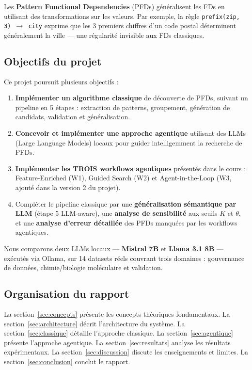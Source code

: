 \documentclass[12pt,a4paper]{article}
\begin{document}
Les \textbf{Pattern Functional Dependencies} (PFDs) g\'{e}n\'{e}ralisent les FDs en utilisant des transformations sur les valeurs. Par exemple, la r\`{e}gle \texttt{prefix(zip, 3) $\rightarrow$ city} exprime que les 3 premiers chiffres d'un code postal d\'{e}terminent g\'{e}n\'{e}ralement la ville --- une r\'{e}gularit\'{e} invisible aux FDs classiques.

\subsection{Objectifs du projet}

Ce projet poursuit plusieurs objectifs :

\begin{enumerate}[label=\arabic*.]
    \item \textbf{Impl\'{e}menter un algorithme classique} de d\'{e}couverte de PFDs, suivant un pipeline en 5 \'{e}tapes : extraction de patterns, groupement, g\'{e}n\'{e}ration de candidats, validation et g\'{e}n\'{e}ralisation.
    \item \textbf{Concevoir et impl\'{e}menter une approche agentique} utilisant des LLMs (Large Language Models) locaux pour guider intelligemment la recherche de PFDs.
    \item \textbf{Impl\'{e}menter les TROIS workflows agentiques} pr\'{e}sent\'{e}s dans le cours : Feature-Enriched (W1), Guided Search (W2) et Agent-in-the-Loop (W3, ajout\'{e} dans la version 2 du projet).
    \item Compl\'{e}ter le pipeline classique par une \textbf{g\'{e}n\'{e}ralisation s\'{e}mantique par LLM} (\'{e}tape 5 LLM-aware), une \textbf{analyse de sensibilit\'{e}} aux seuils $K$ et $\theta$, et une \textbf{analyse d'erreur d\'{e}taill\'{e}e} des PFDs manqu\'{e}es par les workflows agentiques.
\end{enumerate}

Nous comparons deux LLMs locaux --- \textbf{Mistral 7B} et \textbf{Llama 3.1 8B} --- ex\'{e}cut\'{e}s via Ollama, sur 14 datasets r\'{e}els couvrant trois domaines : gouvernance de donn\'{e}es, chimie/biologie mol\'{e}culaire et validation.

\subsection{Organisation du rapport}

La section~\ref{sec:concepts} pr\'{e}sente les concepts th\'{e}oriques fondamentaux. La section~\ref{sec:architecture} d\'{e}crit l'architecture du syst\`{e}me. La section~\ref{sec:classique} d\'{e}taille l'approche classique. La section~\ref{sec:agentique} pr\'{e}sente l'approche agentique. La section~\ref{sec:resultats} analyse les r\'{e}sultats exp\'{e}rimentaux. La section~\ref{sec:discussion} discute les enseignements et limites. La section~\ref{sec:conclusion} conclut le rapport.
\end{document}
